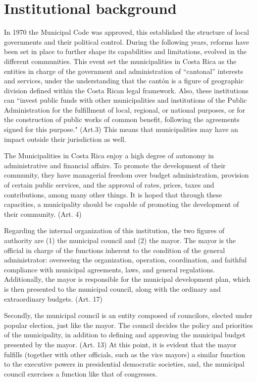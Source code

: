 \section{Institutional background}

In 1970 the Municipal Code was approved, this established the structure of local governments and their political control. During the following years, reforms have been set in place to further shape its capabilities and limitations, evolved in the different communities. \parencite[p. 10]{alfaro2009} This event set the municipalities in Costa Rica as the entities in charge of the government and administration of “cantonal” interests and services, under the understanding that the cantón is a figure of geographic division defined within the Costa Rican legal framework. \parencite[Art. 3]{al1998} Also, these institutions can “invest public funds with other municipalities and institutions of the Public Administration for the fulfillment of local, regional, or national purposes, or for the construction of public works of common benefit, following the agreements signed for this purpose." (Art.3) This means that municipalities may have an impact outside their jurisdiction as well. 

The Municipalities in Costa Rica enjoy a high degree of autonomy in administrative and financial affairs. To promote the development of their community, they have managerial freedom over budget administration, provision of certain public services, and the approval of rates, prices, taxes and contributions, among many other things. It is hoped that through these capacities, a municipality should be capable of promoting the development of their community. (Art. 4) 

Regarding the internal organization of this institution, the two figures of authority are (1) the municipal council and (2) the mayor. The mayor is the official in charge of the functions inherent to the condition of the general administrator: overseeing the organization, operation, coordination, and faithful compliance with municipal agreements, laws, and general regulations. Additionally, the mayor is responsible for the municipal development plan, which is then presented to the municipal council, along with the ordinary and extraordinary budgets. (Art. 17)

Secondly, the municipal council is an entity composed of councilors, elected under popular election, just like the mayor. The council decides the policy and priorities of the municipality, in addition to defining and approving the municipal budget presented by the mayor. (Art. 13) At this point, it is evident that the mayor fulfills (together with other officials, such as the vice mayors) a similar function to the executive powers in presidential democratic societies, and, the municipal council exercises a function like that of congresses.

